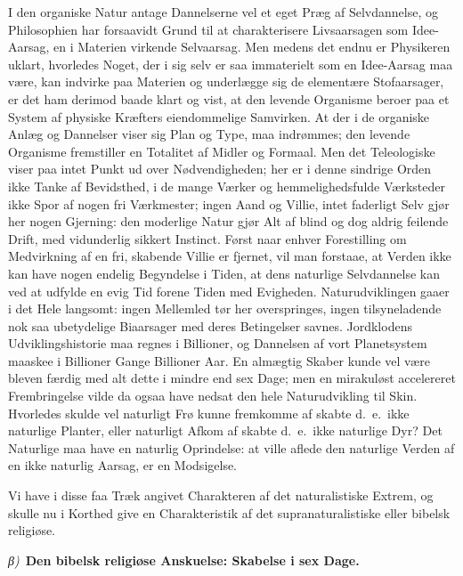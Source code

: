 \documentclass[12pt]{book}
\newcommand{\greekrun}[2]{%
  \medskip\begin{center}{\itshape #1)}\ {\bfseries #2}\end{center}\medskip}
\begin{document}
I den organiske Natur antage Dannelserne vel et eget Præg af
Selvdannelse, og Philosophien har forsaavidt Grund til at
charakterisere Livsaarsagen som Idee-Aarsag, en i Materien virkende
Selvaarsag. Men medens det endnu er Physikeren uklart, hvorledes
Noget, der i sig selv er saa immaterielt som en Idee-Aarsag maa
være, kan indvirke paa Materien og underlægge sig de elementære
Stofaarsager, er det ham derimod baade klart og vist, at den levende
Organisme beroer paa et System af physiske Kræfters eiendommelige
Samvirken. At der i de organiske Anlæg og Dannelser viser sig Plan
og Type, maa indrømmes; den levende Organisme fremstiller en
Totalitet af Midler og Formaal. Men det Teleologiske viser paa intet
Punkt ud over Nødvendigheden; her er i denne sindrige Orden ikke
Tanke af Bevidsthed, i de mange Værker og hemmelighedsfulde
Værksteder ikke Spor af nogen fri Værkmester; ingen Aand og Villie,
intet faderligt Selv gjør her nogen Gjerning: den moderlige Natur
gjør Alt af blind og dog aldrig feilende Drift, med vidunderlig
sikkert Instinct. Først naar enhver Forestilling om Medvirkning af
en fri, skabende Villie er fjernet, vil man forstaae, at Verden ikke
kan have nogen endelig Begyndelse i Tiden, at dens naturlige
Selvdannelse kan ved at udfylde en evig Tid forene Tiden med
Evigheden. Naturudviklingen gaaer i det Hele langsomt: ingen
Mellemled tør her overspringes, ingen tilsyneladende nok saa
ubetydelige Biaarsager med deres Betingelser savnes. Jordklodens
Udviklingshistorie maa regnes i Billioner, og Dannelsen af vort
Planetsystem maaskee i Billioner Gange Billioner Aar. En almægtig
Skaber kunde vel være bleven færdig med alt dette i mindre end sex
Dage; men en mirakuløst accelereret Frembringelse
vilde da ogsaa have nedsat den hele Naturudvikling til Skin.
Hvorledes skulde vel naturligt Frø kunne fremkomme af skabte d.\ e.\
ikke naturlige Planter, eller naturligt Afkom af skabte d.\ e.\ ikke
naturlige Dyr? Det Naturlige maa have en naturlig Oprindelse: at
ville aflede den naturlige Verden af en ikke naturlig Aarsag, er en
Modsigelse.

Vi have i disse faa Træk angivet Charakteren af det naturalistiske
Extrem, og skulle nu i Korthed give en Charakteristik af det
supranaturalistiske eller bibelsk religiøse.

\greekrun{β}{Den bibelsk religiøse Anskuelse: Skabelse i sex Dage.}
\end{document}
